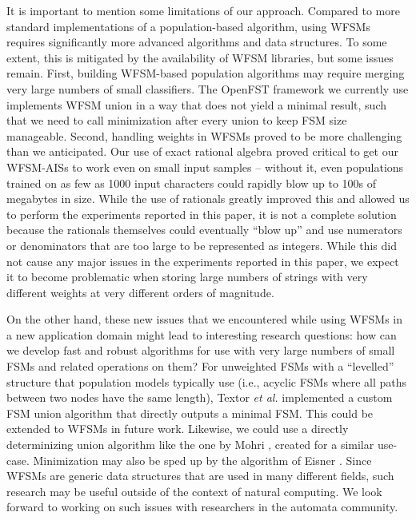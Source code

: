 \documentclass{llncs}
\begin{document}
It is important to mention some limitations of our approach. Compared to more standard implementations of a population-based algorithm, using WFSMs requires significantly more advanced algorithms and data structures. To some extent, this is mitigated by the availability of WFSM libraries, but some issues remain. First, building WFSM-based population algorithms may require
merging very large numbers of small classifiers. The OpenFST framework we currently use
implements WFSM union in a way that does not yield a minimal result, such that we need
to call minimization after every union to keep FSM size manageable. %
Second, handling weights in WFSMs proved to be more challenging than we
anticipated. Our use of exact rational algebra proved critical to get our WFSM-AISs 
to work even on small  input samples -- without it, even populations trained on as 
few as 1000 input characters could rapidly blow up to 100s of megabytes in size. 
While the use of rationals greatly improved this and allowed us to perform the
experiments reported in this paper, it is not a complete solution because the rationals
themselves could eventually ``blow up'' and use numerators or denominators that are too 
large to be represented as integers. 
While this did not cause any major 
issues in the experiments reported in this paper, we expect it to become problematic 
when storing large numbers of strings with very different weights at very different 
orders of magnitude. 

On the other hand, these new issues that we encountered while using WFSMs in a new 
application domain might lead to interesting research questions: how can we develop
fast and robust algorithms for use with very large numbers of small FSMs and related
operations on them? For unweighted FSMs with a ``levelled'' structure that population
models typically use
(i.e., acyclic FSMs where all paths between two nodes have the same length),
Textor \emph{et al.} \cite{Textor2014} implemented a custom FSM union algorithm that directly 
outputs a minimal FSM. This could be extended to WFSMs in future work. 
Likewise, we could use a directly 
determinizing union algorithm like the one by Mohri \cite{Mohri1996}, created for a 
similar use-case. Minimization may also be sped up by the algorithm of 
Eisner \cite{Eisner2003}. Since WFSMs are 
generic data structures that are used in many different fields, such research may be 
useful outside of the context of natural computing. We look forward to working on 
such issues with researchers in the automata community. 
\end{document}
